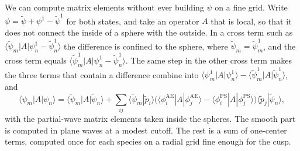 We can compute matrix elements without ever building $\psi$ on a fine grid. Write $\psi = \tilde\psi + \psi^1 - \tilde\psi^1$ for both states, and take an operator $A$ that is local, so that it does not connect the inside of a sphere with the outside. In a cross term such as $\langle\tilde\psi_m|A|\psi^1_n - \tilde\psi^1_n\rangle$ the difference is confined to the sphere, where $\tilde\psi_m = \tilde\psi^1_m$, and the cross term equals $\langle\tilde\psi^1_m|A|\psi^1_n - \tilde\psi^1_n\rangle$. The same step in the other cross term makes the three terms that contain a difference combine into $\langle\psi^1_m|A|\psi^1_n\rangle - \langle\tilde\psi^1_m|A|\tilde\psi^1_n\rangle$, and
\begin{equation}
  \langle\psi_m|A|\psi_n\rangle = \langle\tilde\psi_m|A|\tilde\psi_n\rangle + \sum_{ij}\langle\tilde\psi_m|\tilde p_i\rangle\bigl(\langle\phi^{\mathrm{AE}}_i|A|\phi^{\mathrm{AE}}_j\rangle - \langle\phi^{\mathrm{PS}}_i|A|\phi^{\mathrm{PS}}_j\rangle\bigr)\langle\tilde p_j|\tilde\psi_n\rangle ,
  \label{eq:3.5-PAWop}
\end{equation}
with the partial-wave matrix elements taken inside the spheres. The smooth part is computed in plane waves at a modest cutoff. The rest is a sum of one-center terms, computed once for each species on a radial grid fine enough for the cusp.

